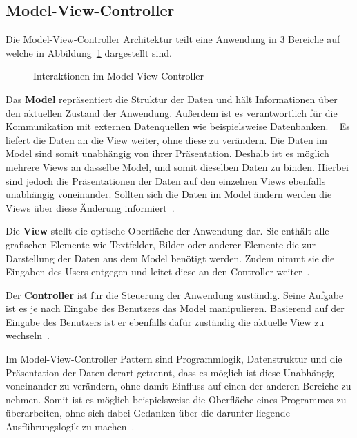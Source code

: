     \newpage
    \subsection{Model-View-Controller}\label{subsec:model-view-controller}
    Die Model-View-Controller Architektur teilt eine Anwendung in 3 Bereiche auf welche in Abbildung~\ref{fig:mvc} dargestellt sind.

    \begin{figure}[h]
        \centering
        
        \caption{Interaktionen im Model-View-Controller}
        \label{fig:mvc}
    \end{figure}

    Das \textbf{Model} repräsentiert die Struktur der Daten und hält Informationen über den aktuellen Zustand der Anwendung.
    Außerdem ist es verantwortlich für die Kommunikation mit externen Datenquellen wie beispielsweise Datenbanken.
    ~\cite{mvc}
    Es liefert die Daten an die View weiter, ohne diese zu verändern.
    Die Daten im Model sind somit unabhängig von ihrer Präsentation.
    Deshalb ist es möglich mehrere Views an dasselbe Model, und somit dieselben Daten zu binden.
    Hierbei sind jedoch die Präsentationen der Daten auf den einzelnen Views ebenfalls unabhängig voneinander.
    Sollten sich die Daten im Model ändern werden die Views über diese Änderung informiert~\cite{https://doi.org/10.48550/arxiv.1408.5786}.

    Die \textbf{View} stellt die optische Oberfläche der Anwendung dar.
    Sie enthält alle grafischen Elemente wie Textfelder, Bilder oder anderer Elemente die zur Darstellung der Daten aus dem Model benötigt werden.
    Zudem nimmt sie die Eingaben des Users entgegen und leitet diese an den Controller weiter~\cite{https://doi.org/10.48550/arxiv.1408.5786}.


    Der \textbf{Controller} ist für die Steuerung der Anwendung zuständig.
    Seine Aufgabe ist es je nach Eingabe des Benutzers das Model manipulieren.
    Basierend auf der Eingabe des Benutzers ist er ebenfalls dafür zuständig die aktuelle View zu wechseln~\cite{https://doi.org/10.48550/arxiv.1408.5786}.


    Im Model-View-Controller Pattern sind Programmlogik, Datenstruktur und die Präsentation der Daten derart getrennt, dass es möglich ist diese Unabhängig voneinander zu verändern, ohne damit Einfluss auf einen der anderen Bereiche zu nehmen.
    Somit ist es möglich beispielsweise die Oberfläche eines Programmes zu überarbeiten, ohne sich dabei Gedanken über die darunter liegende Ausführungslogik zu machen~\cite{mvc}.

